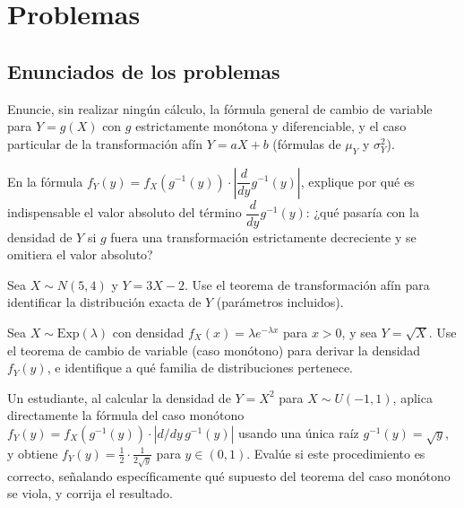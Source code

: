 \section*{Problemas}

\subsection*{Enunciados de los problemas}

\begin{problema}
	\label{prob:d3727e9}
	Enuncie, sin realizar ningún cálculo, la fórmula general de cambio de variable para $Y=g(X)$ con $g$ estrictamente monótona y diferenciable, y el caso particular de la transformación afín $Y=aX+b$ (fórmulas de $\mu_Y$ y $\sigma_Y^2$).
\end{problema}

\begin{problema}
	\label{prob:fbf2d01}
	En la fórmula $f_Y(y) = f_X(g^{-1}(y))\cdot\left|\dfrac{d}{dy}g^{-1}(y)\right|$, explique por qué es indispensable el valor absoluto del término $\dfrac{d}{dy}g^{-1}(y)$: ¿qué pasaría con la densidad de $Y$ si $g$ fuera una transformación estrictamente decreciente y se omitiera el valor absoluto?
\end{problema}

\begin{problema}
	\label{prob:d795060}
	Sea $X \sim N(5,4)$ y $Y=3X-2$. Use el teorema de transformación afín para identificar la distribución exacta de $Y$ (parámetros incluidos).
\end{problema}

\begin{problema}
	\label{prob:182603c}
	Sea $X \sim \text{Exp}(\lambda)$ con densidad $f_X(x)=\lambda e^{-\lambda x}$ para $x>0$, y sea $Y=\sqrt{X}$. Use el teorema de cambio de variable (caso monótono) para derivar la densidad $f_Y(y)$, e identifique a qué familia de distribuciones pertenece.
\end{problema}

\begin{problema}
	\label{prob:5ce800e}
	Un estudiante, al calcular la densidad de $Y=X^2$ para $X\sim U(-1,1)$, aplica directamente la fórmula del caso monótono $f_Y(y) = f_X(g^{-1}(y))\cdot|d/dy\,g^{-1}(y)|$ usando una única raíz $g^{-1}(y)=\sqrt{y}$, y obtiene $f_Y(y) = \frac{1}{2}\cdot\frac{1}{2\sqrt{y}}$ para $y\in(0,1)$. Evalúe si este procedimiento es correcto, señalando específicamente qué supuesto del teorema del caso monótono se viola, y corrija el resultado.
\end{problema}

